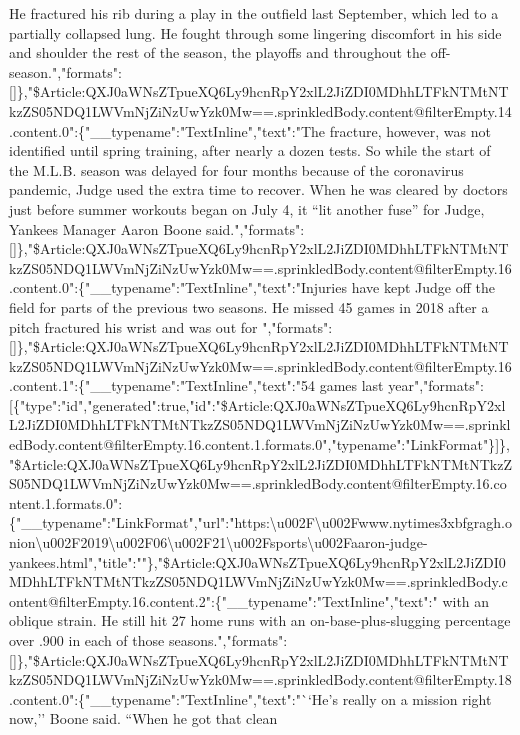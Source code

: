 He fractured his rib during a play in the outfield last September, which
led to a partially collapsed lung. He fought through some lingering
discomfort in his side and shoulder the rest of the season, the playoffs
and throughout the
off-season.","formats":{[}{]}\},"\$Article:QXJ0aWNsZTpueXQ6Ly9hcnRpY2xlL2JiZDI0MDhhLTFkNTMtNTkzZS05NDQ1LWVmNjZiNzUwYzk0Mw==.sprinkledBody.content@filterEmpty.14.content.0":\{"\_\_typename":"TextInline","text":"The
fracture, however, was not identified until spring training, after
nearly a dozen tests. So while the start of the M.L.B. season was
delayed for four months because of the coronavirus pandemic, Judge used
the extra time to recover. When he was cleared by doctors just before
summer workouts began on July 4, it ``lit another fuse'' for Judge,
Yankees Manager Aaron Boone
said.","formats":{[}{]}\},"\$Article:QXJ0aWNsZTpueXQ6Ly9hcnRpY2xlL2JiZDI0MDhhLTFkNTMtNTkzZS05NDQ1LWVmNjZiNzUwYzk0Mw==.sprinkledBody.content@filterEmpty.16.content.0":\{"\_\_typename":"TextInline","text":"Injuries
have kept Judge off the field for parts of the previous two seasons. He
missed 45 games in 2018 after a pitch fractured his wrist and was out
for
","formats":{[}{]}\},"\$Article:QXJ0aWNsZTpueXQ6Ly9hcnRpY2xlL2JiZDI0MDhhLTFkNTMtNTkzZS05NDQ1LWVmNjZiNzUwYzk0Mw==.sprinkledBody.content@filterEmpty.16.content.1":\{"\_\_typename":"TextInline","text":"54
games last
year","formats":{[}\{"type":"id","generated":true,"id":"\$Article:QXJ0aWNsZTpueXQ6Ly9hcnRpY2xlL2JiZDI0MDhhLTFkNTMtNTkzZS05NDQ1LWVmNjZiNzUwYzk0Mw==.sprinkledBody.content@filterEmpty.16.content.1.formats.0","typename":"LinkFormat"\}{]}\},"\$Article:QXJ0aWNsZTpueXQ6Ly9hcnRpY2xlL2JiZDI0MDhhLTFkNTMtNTkzZS05NDQ1LWVmNjZiNzUwYzk0Mw==.sprinkledBody.content@filterEmpty.16.content.1.formats.0":\{"\_\_typename":"LinkFormat","url":"https:\textbackslash{}u002F\textbackslash{}u002Fwww.nytimes3xbfgragh.onion\textbackslash{}u002F2019\textbackslash{}u002F06\textbackslash{}u002F21\textbackslash{}u002Fsports\textbackslash{}u002Faaron-judge-yankees.html","title":""\},"\$Article:QXJ0aWNsZTpueXQ6Ly9hcnRpY2xlL2JiZDI0MDhhLTFkNTMtNTkzZS05NDQ1LWVmNjZiNzUwYzk0Mw==.sprinkledBody.content@filterEmpty.16.content.2":\{"\_\_typename":"TextInline","text":"
with an oblique strain. He still hit 27 home runs with an
on-base-plus-slugging percentage over .900 in each of those
seasons.","formats":{[}{]}\},"\$Article:QXJ0aWNsZTpueXQ6Ly9hcnRpY2xlL2JiZDI0MDhhLTFkNTMtNTkzZS05NDQ1LWVmNjZiNzUwYzk0Mw==.sprinkledBody.content@filterEmpty.18.content.0":\{"\_\_typename":"TextInline","text":"``He's
really on a mission right now,'' Boone said. ``When he got that clean

